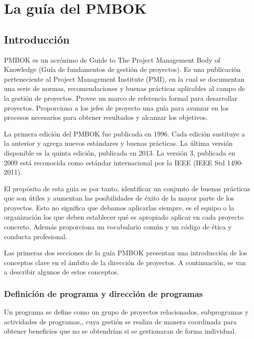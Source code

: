 \newpage{}
\section{La guía del PMBOK}

\subsection{Introducción}

PMBOK es un acrónimo de Guide to The Project Management Body of Knowledge (Guía de fundamentos de gestión de proyectos). Es una publicación perteneciente al Project Management Institute (PMI), en la cual se documentan una serie de normas, recomendaciones y buenas prácticas aplicables al campo de la gestión de proyectos. Provee un marco de referencia formal para desarrollar proyectos. Proporciona a los jefes de proyecto una guía para avanzar en los procesos necesarios para obtener resultados y alcanzar los objetivos. 

La primera edición del PMBOK fue publicada en 1996. Cada edición sustituye a la anterior y agrega nuevos estándares y buenas prácticas. La última versión disponible es la quinta edición, publicada en 2013. La versión 3, publicada en 2009 está reconocida como estándar internacional por la IEEE (IEEE Std 1490-2011).

El propósito de esta guía es por tanto, identificar un conjunto de buenas prácticas que son útiles y aumentan las posibilidades de éxito de la mayor parte de los proyectos. Esto no significa que debamos aplicarlas siempre, es el equipo o la organización los que deben establecer qué es apropiado aplicar en cada proyecto concreto. Además proporciona un vocabulario común y un código de ética y conducta profesional.

Las primeras dos secciones de la guía PMBOK presentan una introducción de los conceptos clave en el ámbito de la dirección de proyectos. A continuación, se van a describir algunos de estos conceptos.

\subsubsection{Definición de programa y dirección de programas}

Un programa se define como un grupo de proyectos relacionados, subprogramas y actividades de programas,, cuya gestión se realiza de manera coordinada para obtener beneficios que no se obtendrían si se gestionaran de forma individual.

